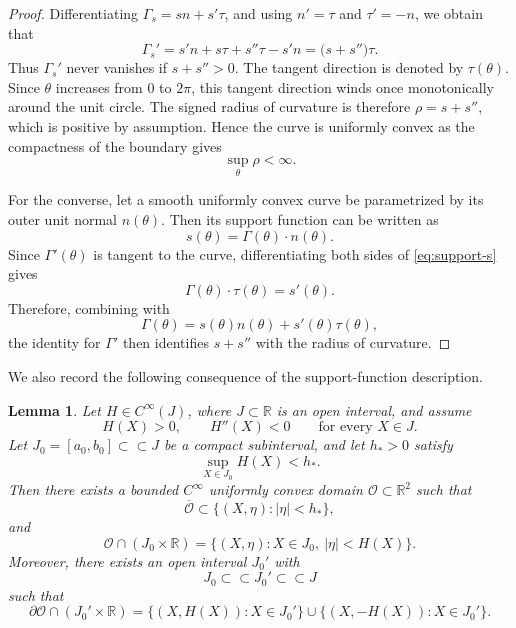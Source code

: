 \documentclass[reqno,12pt]{amsart}
\numberwithin{equation}{section}
\newtheorem{lemma}[theorem]{Lemma}
\theoremstyle{remark}
\begin{document}
\begin{proof}
Differentiating $\Gamma_s=s n+s'\tau$, and using $n'=\tau$ and $\tau'=-n$,
we obtain that
$$
 \Gamma_s' =s'n+s\tau+s''\tau-s'n  =\bigl(s+s''\bigr)\tau.
$$
Thus $\Gamma_s'$ never vanishes if $s+s''>0$.  The tangent direction is denoted by $\tau(\theta)$. Since $\theta$ increases from $0$ to $2\pi$, this tangent direction winds once monotonically around the unit circle.  The signed radius of curvature is therefore $\rho=s+s''$, which is positive by assumption.  Hence the curve is uniformly convex as the compactness of the boundary gives
$$\sup_\theta \rho<\infty. $$

For the converse, let a smooth uniformly convex curve be parametrized by its outer unit normal $n(\theta)$. Then its support function can be written as
\begin{equation}\label{eq:support-s}
     s(\theta)=\Gamma(\theta)\cdot n(\theta).
\end{equation}
Since $\Gamma'(\theta)$ is tangent to the curve, differentiating both sides of \eqref{eq:support-s} gives $$\Gamma(\theta)\cdot\tau(\theta)=s'(\theta).$$  
Therefore, combining with 
$$
 \Gamma(\theta)=s(\theta)n(\theta)+s'(\theta)\tau(\theta),
$$
the identity for $\Gamma'$ then identifies $s+s''$ with the radius of curvature.
\end{proof}

We also record the following consequence of the support-function description.

\begin{lemma}\label{lem:cap-completion}
Let $H\in C^\infty(J)$, where $J\subset\mathbb R$ is an open interval, and assume
$$
H(X)>0,\qquad H''(X)<0
\qquad\text{for every }X\in J.
$$
Let $J_0=[a_0,b_0]\subset\subset J$ be a compact subinterval, and let $h_*>0$ satisfy
$$
\sup_{X\in J_0}H(X)<h_*.
$$
Then there exists a bounded $C^\infty$ uniformly convex domain
$\mathcal O\subset\mathbb R^2$ such that
\begin{equation}\label{eq:cap-strip}
\overline{\mathcal O}\subset\{(X,\eta):|\eta|<h_*\},
\end{equation}
and
\begin{equation}\label{eq:exact-central-channel}
\mathcal O\cap (J_0\times\mathbb R)
= \{(X,\eta):X\in J_0,\ |\eta|<H(X)\}.
\end{equation}
Moreover, there exists an open interval $J_0'$ with 
$$J_0\subset\subset J_0'\subset\subset J$$
such that
$$
\partial\mathcal O \cap (J_0'\times \mathbb R)= \{(X,H(X)):X\in J_0'\} \cup \{(X,-H(X)):X\in J_0'\}.
$$
\end{lemma}
\end{document}
